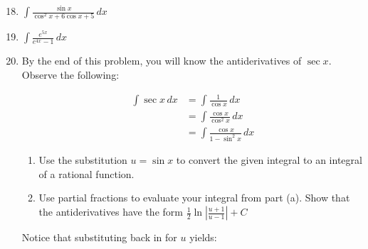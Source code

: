 \documentclass[12pt]{article}
\newif\ifans
\begin{document}
\begin{enumerate}
\setcounter{enumi}{17}

\item $\int \frac{\sin{x}}{\cos^2{x}+6\cos{x}+5} \,dx$

\ifans{\fbox{$\ln{|\cos{x}+3|}-\ln{|\cos{x}+2|}+C$}} \fi

\item $\int \frac{e^{5x}}{e^{4x}-1} \,dx$

\ifans{\fbox{$e^{x}+\frac{1}{4}\ln|e^x-1|-\frac{1}{4}\ln(e^x+1)-\frac{1}{2}\tan^{-1}(e^x)+C$}} \fi

\newpage

\item By the end of this problem, you will know the antiderivatives of $\sec{x}$.  Observe the following:
\begin{center}
\begin{align*}
\int \sec{x} \,dx &= \int \frac{1}{\cos{x}} \,dx\\
&= \int \frac{\cos{x}}{\cos^2{x}} \,dx\\
&= \int \frac{\cos{x}}{1-\sin^2{x}} \,dx
\end{align*}
\end{center}
\begin{enumerate}

\item Use the substitution $u=\sin{x}$ to convert the given integral to an integral of a rational function.  

\ifans{\fbox{$\int \frac{1}{1-u^2} \,du$}} \fi

\item Use partial fractions to evaluate your integral from part (a).  Show that the antiderivatives have the form $\frac{1}{2}\ln{\left|\frac{u+1}{u-1}\right|}+C$

\ifans{\fbox{\parbox{1\linewidth}{
\begin{align*}
\int \frac{1}{u^2-1}\,du &= \int \frac{1}{2}\left(\frac{1}{u-1}\right)-\frac{1}{2}\left(\frac{1}{u+1}\right) \,du\\
&=\frac{1}{2}\ln{|u+1|}-\frac{1}{2}\ln{|u-1|}+C\\
&=\frac{1}{2}\ln{\left|\frac{u+1}{u-1}\right|}+C
\end{align*}
}}} \fi

\end{enumerate}

Notice that substituting back in for $u$ yields:


\end{enumerate}
\end{document}
